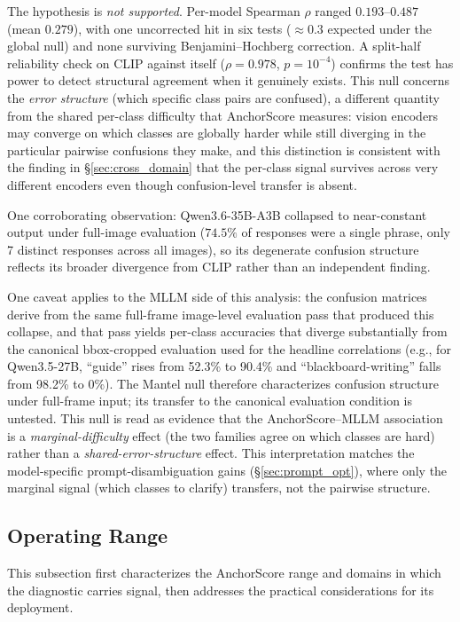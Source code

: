 \documentclass[a4paper,fleqn]{cas-sc}
\begin{document}
\label{sec:mantel}
The hypothesis is \emph{not supported}. Per-model Spearman $\rho$ ranged $0.193$--$0.487$ (mean $0.279$), with one uncorrected hit in six tests ($\approx 0.3$ expected under the global null) and none surviving Benjamini--Hochberg correction. A split-half reliability check on CLIP against itself ($\rho{=}0.978$, $p{=}10^{-4}$) confirms the test has power to detect structural agreement when it genuinely exists. This null concerns the \emph{error structure} (which specific class pairs are confused), a different quantity from the shared per-class difficulty that AnchorScore measures: vision encoders may converge on which classes are globally harder while still diverging in the particular pairwise confusions they make, and this distinction is consistent with the finding in \S\ref{sec:cross_domain} that the per-class signal survives across very different encoders even though confusion-level transfer is absent.

One corroborating observation: Qwen3.6-35B-A3B collapsed to near-constant output under full-image evaluation ($74.5\%$ of responses were a single phrase, only 7 distinct responses across all images), so its degenerate confusion structure reflects its broader divergence from CLIP rather than an independent finding.

One caveat applies to the MLLM side of this analysis: the confusion matrices derive from the same full-frame image-level evaluation pass that produced this collapse, and that pass yields per-class accuracies that diverge substantially from the canonical bbox-cropped evaluation used for the headline correlations (e.g., for Qwen3.5-27B, ``guide'' rises from 52.3\% to 90.4\% and ``blackboard-writing'' falls from 98.2\% to 0\%). The Mantel null therefore characterizes confusion structure under full-frame input; its transfer to the canonical evaluation condition is untested. This null is read as evidence that the AnchorScore--MLLM association is a \emph{marginal-difficulty} effect (the two families agree on which classes are hard) rather than a \emph{shared-error-structure} effect. This interpretation matches the model-specific prompt-disambiguation gains (\S\ref{sec:prompt_opt}), where only the marginal signal (which classes to clarify) transfers, not the pairwise structure.

\subsection{Operating Range}

This subsection first characterizes the AnchorScore range and domains in which the diagnostic carries signal, then addresses the practical considerations for its deployment.
\end{document}
